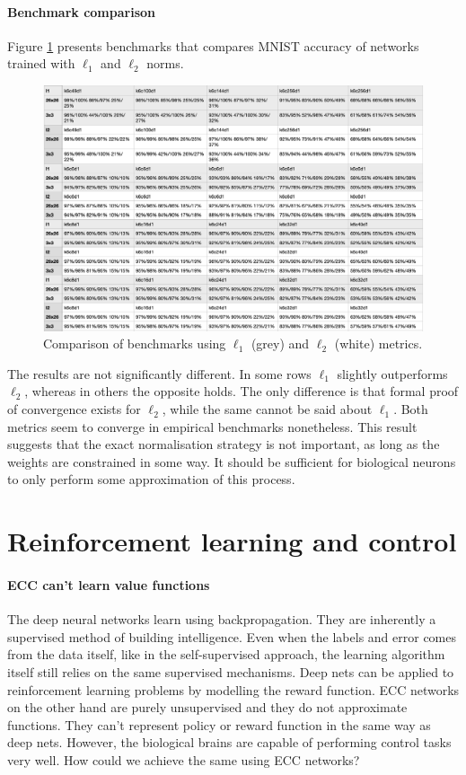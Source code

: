 \documentclass[12pt]{article}
\begin{document}
\paragraph{Benchmark comparison}
Figure \ref{fig:benchmarks_l2} presents benchmarks that compares MNIST accuracy of networks trained with $\ell_1$ and $\ell_2$ norms. 
\begin{figure}[!htbp]
	\centering
	\includegraphics[width=13.8cm]{benchmarks_l2}
	\caption{Comparison of benchmarks using $\ell_1$ (grey) and $\ell_2$ (white) metrics.}
	\label{fig:benchmarks_l2}
\end{figure}
The results are not significantly different. In some rows $\ell_1$ slightly outperforms $\ell_2$, whereas in others the opposite holds. The only difference is that formal proof  of convergence exists for $\ell_2$, while the same cannot be said about $\ell_1$.
Both metrics seem to converge in empirical benchmarks nonetheless. This result suggests that the exact normalisation strategy is not important, as long as the weights are constrained in some way. It should be sufficient for biological neurons to only perform some approximation of this process. 
 
\section{Reinforcement learning and control}

\paragraph{ECC can't learn value functions}

The deep neural networks learn using backpropagation. They are inherently a supervised method of building intelligence. Even when the labels and error comes from the data itself, like in the self-supervised approach, the learning algorithm itself still relies on the same supervised mechanisms. Deep nets can be applied to reinforcement learning problems by modelling the reward function. ECC networks on the other hand are purely unsupervised and they do not approximate functions. They can't represent policy or reward function in the same way as deep nets. However, the biological brains are capable of performing control tasks very well. How could we achieve the same using ECC networks?
\end{document}
